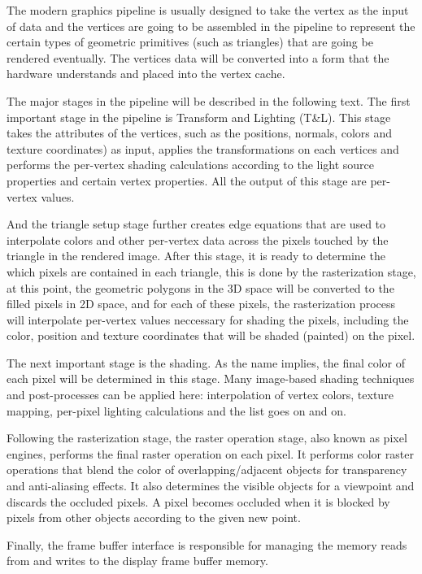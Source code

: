 The modern graphics pipeline is usually designed to take the vertex as the input of data and the vertices are going to be assembled in the pipeline to represent the certain types of geometric primitives (such as triangles) that are going be rendered eventually. The vertices data will be converted into a form that the hardware understands and placed into the vertex cache.  

The major stages in the pipeline will be described in the following text. The first important stage in the pipeline is Transform and Lighting (T\&L). This stage takes the attributes of the vertices, such as the positions, normals, colors and texture coordinates) as input, applies the transformations on each vertices and performs the per-vertex shading calculations according to the light source properties and certain vertex properties. All the output of this stage are per-vertex values.

And the triangle setup stage further creates edge equations that are used to interpolate colors and other per-vertex data across the pixels touched by the triangle in the rendered image. After this stage, it is ready to determine the which pixels are contained in each triangle, this is done by the rasterization stage, at this point, the geometric polygons in the 3D space will be converted to the filled pixels in 2D space, and for each of these pixels, the rasterization process will interpolate per-vertex values neccessary for shading the pixels, including the color, position and texture coordinates that will be shaded (painted) on the pixel.

The next important stage is the shading. As the name implies, the final color of each pixel will be determined in this stage. Many image-based shading techniques and post-processes can be applied here: interpolation of vertex colors, texture mapping, per-pixel lighting calculations and the list goes on and on. 

Following the rasterization stage, the raster operation stage, also known as pixel engines, performs the final raster operation on each pixel. It performs color raster operations that blend the color of overlapping/adjacent objects for transparency and anti-aliasing effects. It also determines the visible objects for a viewpoint and discards the occluded pixels. A pixel becomes occluded when it is blocked by pixels from other objects according to the given new point. 

Finally, the frame buffer interface is responsible for managing the memory reads from and writes to the display frame buffer memory.   

